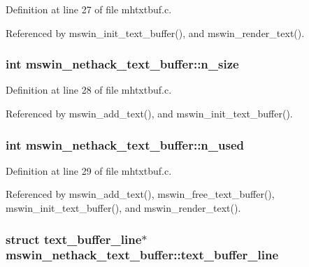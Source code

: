 Definition at line 27 of file mhtxtbuf.\+c.



Referenced by mswin\+\_\+init\+\_\+text\+\_\+buffer(), and mswin\+\_\+render\+\_\+text().

\hypertarget{structmswin__nethack__text__buffer_a68d3b91e928c9eda9cad2cbae937de64}{
\subsubsection[{n\+\_\+size}]{\setlength{\rightskip}{0pt plus 5cm}int mswin\+\_\+nethack\+\_\+text\+\_\+buffer\+::n\+\_\+size}}\label{structmswin__nethack__text__buffer_a68d3b91e928c9eda9cad2cbae937de64}


Definition at line 28 of file mhtxtbuf.\+c.



Referenced by mswin\+\_\+add\+\_\+text(), and mswin\+\_\+init\+\_\+text\+\_\+buffer().

\hypertarget{structmswin__nethack__text__buffer_a415404171adf88a11b4e5cba4dc55710}{
\subsubsection[{n\+\_\+used}]{\setlength{\rightskip}{0pt plus 5cm}int mswin\+\_\+nethack\+\_\+text\+\_\+buffer\+::n\+\_\+used}}\label{structmswin__nethack__text__buffer_a415404171adf88a11b4e5cba4dc55710}


Definition at line 29 of file mhtxtbuf.\+c.



Referenced by mswin\+\_\+add\+\_\+text(), mswin\+\_\+free\+\_\+text\+\_\+buffer(), mswin\+\_\+init\+\_\+text\+\_\+buffer(), and mswin\+\_\+render\+\_\+text().

\hypertarget{structmswin__nethack__text__buffer_a50aafb5cf8dde4a5a2e86bd1247d7736}{
\subsubsection[{text\+\_\+buffer\+\_\+line}]{\setlength{\rightskip}{0pt plus 5cm}struct {\bf text\+\_\+buffer\+\_\+line}$\ast$ mswin\+\_\+nethack\+\_\+text\+\_\+buffer\+::text\+\_\+buffer\+\_\+line}}\label{structmswin__nethack__text__buffer_a50aafb5cf8dde4a5a2e86bd1247d7736}


